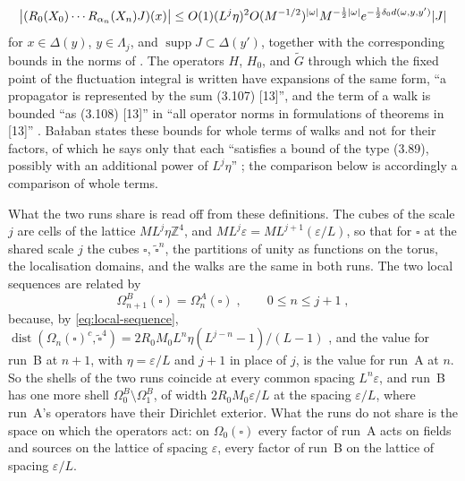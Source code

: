 \documentclass[11pt]{preprint}
\newcommand{\dist}{\operatorname{dist}}
\DeclarePairedDelimiter{\abs}{\lvert}{\rvert}
\numberwithin{equation}{section}
\theoremstyle{definition}
\theoremstyle{remark}
\theoremstyle{plain}
\begin{document}
\begin{equation}\label{eq:walk-bound}
    \bigl\lvert(R_0(X_0)\cdots R_{\alpha_n}(X_n)J)(x)\bigr\rvert \leq O(1)(L^j\eta)^2O(M^{-1/2})^{\abs{\omega}}M^{-\frac12\abs{\omega}}e^{-\frac12\delta_0d(\omega, y, y')}\abs{J}
\end{equation}
for $x \in \Delta(y)$, $y \in \Lambda_j$, and $\operatorname{supp}J \subset \Delta(y')$, together with the corresponding bounds in the norms of \cite[(3.42)--(3.47)]{BalabanPBG} \cite[Theorem~3.10, (3.107), (3.108), p.~416]{BalabanPBG}. The operators $H$, $H_0$, and $\tilde G$ through which the fixed point of the fluctuation integral is written \cite[(1.2)--(1.4), p.~2]{BalabanRG2} have expansions of the same form, ``a propagator is represented by the sum (3.107) [13]'', and the term of a walk is bounded ``as (3.108) [13]'' in ``all operator norms in formulations of theorems in [13]'' \cite[(1.6), (1.7), p.~3]{BalabanRG2}. Ba{\l}aban states these bounds for whole terms of walks and not for their factors, of which he says only that each ``satisfies a bound of the type (3.89), possibly with an additional power of $L^j\eta$'' \cite[p.~413]{BalabanPBG}; the comparison below is accordingly a comparison of whole terms.

What the two runs share is read off from these definitions. The cubes of the scale $j$ are cells of the lattice $ML^j\eta\mathbb Z^4$, and $ML^j\varepsilon = ML^{j+1}(\varepsilon/L)$, so that for $\square$ at the shared scale $j$ the cubes $\square$, $\tilde\square^n$, the partitions of unity as functions on the torus, the localisation domains, and the walks are the same in both runs. The two local sequences are related by
\begin{equation}\label{eq:shared-shells}
    \Omega^B_{n+1}(\square) = \Omega^A_n(\square)\;,
    \qquad 0 \leq n \leq j + 1\;,
\end{equation}
because, by \eqref{eq:local-sequence}, $\dist(\Omega_n(\square)^c, \tilde\square^4) = 2R_0M_0L^n\eta(L^{j-n} - 1)/(L - 1)$ \cite[p.~408]{BalabanPBG}, and the value for run~B at $n + 1$, with $\eta = \varepsilon/L$ and $j + 1$ in place of $j$, is the value for run~A at $n$. So the shells of the two runs coincide at every common spacing $L^n\varepsilon$, and run~B has one more shell $\Omega^B_0 \setminus \Omega^B_1$, of width $2R_0M_0\varepsilon/L$ at the spacing $\varepsilon/L$, where run~A's operators have their Dirichlet exterior. What the runs do not share is the space on which the operators act: on $\Omega_0(\square)$ every factor of run~A acts on fields and sources on the lattice of spacing $\varepsilon$, every factor of run~B on the lattice of spacing $\varepsilon/L$.
\end{document}
